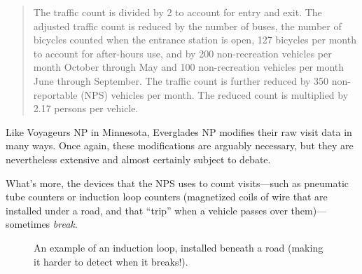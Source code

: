 \documentclass[
  letterpaper,
  DIV=11,
  numbers=noendperiod]{scrartcl}
\begin{document}
\begin{quote}
The traffic count is divided by 2 to account for entry and exit. The
adjusted traffic count is reduced by the number of buses, the number of
bicycles counted when the entrance station is open, 127 bicycles per
month to account for after-hours use, and by 200 non-recreation vehicles
per month October through May and 100 non-recreation vehicles per month
June through September. The traffic count is further reduced by 350
non-reportable (NPS) vehicles per month. The reduced count is multiplied
by 2.17 persons per vehicle.
\end{quote}

Like Voyageurs NP in Minnesota, Everglades NP modifies their raw visit
data in many ways. Once again, these modifications are arguably
necessary, but they are nevertheless extensive and almost certainly
subject to debate.

What's more, the devices that the NPS uses to count visits---such as
pneumatic tube counters or induction loop counters (magnetized coils of
wire that are installed under a road, and that ``trip'' when a vehicle
passes over them)---sometimes \emph{break}.

\begin{figure}


\caption{\label{fig-induction}An example of an induction loop, installed
beneath a road (making it harder to detect when it breaks!).}

\end{figure}%
\end{document}
